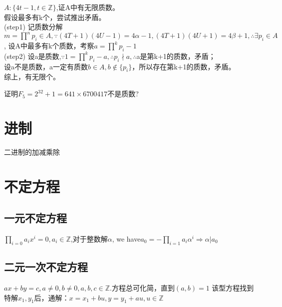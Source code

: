 \documentclass[UTF8]{../09-Mathematics}
\begin{document}
\begin{proposition}
    $A:\{ 4t-1, t \in \mathbb Z\}$,证A中有无限质数。\\

    假设最多有k个，尝试推出矛盾。\\
    (step1) 记质数分解$m = \prod^{n}p_i \in A, \because (4T+1)(4U-1)=4\alpha -1, (4T+1)(4U+1)=4\beta +1, \therefore \exists p_i \in A$, 设A中最多有k个质数，考察$a =\prod^{k}p_i-1 $\\
    (step2) 设a是质数,$\because 1 =\prod^{k}p_i - a, \therefore p_i \nmid a, \therefore $a是第k+1的质数，矛盾；\\
    设a不是质数，a一定有质数$b \in A, b\notin \{ p_i\}$，所以存在第k+1的质数，矛盾。\\
    综上，有无限个。



\end{proposition}

\begin{proposition}
    证明$F_5 = 2^32+1 = 641 \times 6700417$不是质数?
\end{proposition}




\section{进制}

二进制的加减乘除


\section{不定方程}

\subsection{一元不定方程}
$\prod_{i=0} a_ix^i = 0, a_i  \in \mathbb Z$,对于整数解$\alpha$, we have$a_0 = -\prod_{i=1} a_i\alpha^i \Rightarrow \alpha | a_0 $


\subsection{二元一次不定方程}

$ax + by = c, a \neq 0, b \neq 0, a, b, c \in \mathbb Z$.方程总可化简，直到$(a,b) = 1$
该型方程找到特解$x_1, y_1$后，通解：$x = x_1 + bu, y = y_1 + au, u \in \mathbb Z$
\end{document}
